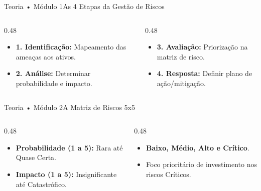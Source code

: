 \begin{senaiframe}{Teoria • Módulo 1}{As 4 Etapas da Gestão de Riscos}
  \begin{columns}[t]
    \begin{column}{0.48\textwidth}
      \begin{tcolorbox}[senaibluecard, title={Identificação \& Análise}]
        \begin{itemize}
          \item \textbf{1. Identificação:} Mapeamento das ameaças aos ativos.
          \item \textbf{2. Análise:} Determinar probabilidade e impacto.
        \end{itemize}
      \end{tcolorbox}
    \end{column}
    \begin{column}{0.48\textwidth}
      \begin{tcolorbox}[senaigreencard, title={Avaliação \& Resposta}]
        \begin{itemize}
          \item \textbf{3. Avaliação:} Priorização na matriz de risco.
          \item \textbf{4. Resposta:} Definir plano de ação/mitigação.
        \end{itemize}
      \end{tcolorbox}
    \end{column}
  \end{columns}
\end{senaiframe}

\begin{senaiframe}{Teoria • Módulo 2}{A Matriz de Riscos 5x5}
  \begin{columns}[t]
    \begin{column}{0.48\textwidth}
      \begin{tcolorbox}[senairedcard, title={Eixos de Avaliação}]
        \begin{itemize}
          \item \textbf{Probabilidade (1 a 5):} Rara até Quase Certa.
          \item \textbf{Impacto (1 a 5):} Insignificante até Catastrófico.
        \end{itemize}
      \end{tcolorbox}
    \end{column}
    \begin{column}{0.48\textwidth}
      \begin{tcolorbox}[senaiambercard, title={Categorias de Severidade}]
        \begin{itemize}
          \item \textbf{Baixo, Médio, Alto e Crítico}.
          \item Foco prioritário de investimento nos riscos Críticos.
        \end{itemize}
      \end{tcolorbox}
    \end{column}
  \end{columns}
\end{senaiframe}


